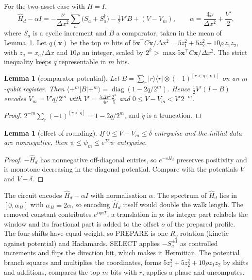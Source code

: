 \documentclass[11pt,a4paper]{article}
\newtheorem{lemma}[proposition]{Lemma}
\theoremstyle{remark}
\newcommand{\x}{\mathbf x}
\newcommand{\Hd}{\hat H_d}
\begin{document}
For the two-asset case with $H=I$,
\begin{equation}
 \Hd-\alpha I=-\frac\nu{\Delta x^2}\sum_a\bigl(S_a+S_a^\dagger\bigr)-\tfrac12V'B
 +(V-V_m),\qquad
 \alpha=\frac{4\nu}{\Delta x^2}+\frac{V'}2,
 \label{eq:lcu}
\end{equation}
where $S_a$ is a cyclic increment and $B$ a comparator, taken in the mean of
Lemma~\ref{lem:comp}. Let $q(\x)$ be the top $m$ bits of
$5\x^\top C\x/\Delta x^2=5z_1^2+5z_2^2+10\rho\,z_1z_2$, with $z_a=x_a/\Delta x$
and $10\rho$ an integer, scaled by $2^k>\max 5\x^\top C\x/\Delta x^2$.
The strict inequality keeps $q$ representable in $m$ bits.

\begin{lemma}[comparator potential]
\label{lem:comp}
Let $B=\sum_r|r\rangle\langle r|\otimes(-1)^{[r<q(\x)]}$ on an $m$-qubit register.
Then $\langle+^m|B|+^m\rangle=\operatorname{diag}(1-2q/2^m)$. Hence
$\tfrac12V'(I-B)$ encodes $V_m=V'q/2^m$ with
$V'=\tfrac{\lambda\Delta x^2}{4\nu}\tfrac{2^k}5$ and
$0\le V-V_m<V'2^{-m}$.
\end{lemma}
\begin{proof}
$2^{-m}\sum_r(-1)^{[r<q]}=1-2q/2^m$, and $q$ is a truncation.
\end{proof}

\begin{lemma}[effect of rounding]
\label{lem:round}
If $0\le V-V_m\le\delta$ entrywise and the initial data are nonnegative, then
$\psi\le\psi_m\le e^{T\delta}\psi$ entrywise.
\end{lemma}
\begin{proof}
$-\Hd$ has nonnegative off-diagonal entries, so $e^{-s\Hd}$ preserves
positivity and is monotone decreasing in the diagonal potential. Compare
with the potentials $V$ and $V-\delta$.
\end{proof}

The circuit encodes $\Hd-\alpha I$ with normalisation $\alpha$. The spectrum of $\Hd$
lies in $[0,\alpha_H]$ with $\alpha_H=2\alpha$, so encoding $\Hd$ itself would double the
walk length. The removed constant contributes $e^{i\eta\alpha T}$, a translation in $p$: its
integer part relabels the window and its fractional part is added to the offset $o$ of the prepared
profile. The four shifts have equal weight, so PREPARE is one $R_y$ rotation
(kinetic against potential) and Hadamards. SELECT applies $-S_a^{\pm1}$ as
controlled increments and flips the direction bit, which makes it Hermitian.
The potential branch squares and multiplies the coordinates, forms
$5z_1^2+5z_2^2+10\rho z_1z_2$ by shifts and additions, compares the top $m$
bits with $r$, applies a phase and uncomputes.
\end{document}
